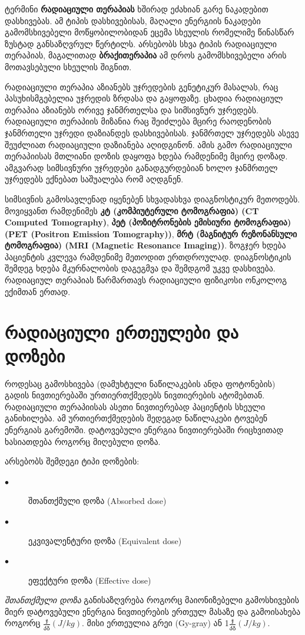 \documentclass[12pt,a4paper,]{report}
\begin{document}
ტერმინი \textbf{რადიაციული თერაპიას} ხშირად ეძახიან  გარე ნაკადებით დასხივებას. ამ ტიპის დასხივებისას, მაღალი ენერგიის ნაკადები გამომსხივებელი მოწყობილობიდან ეცემა სხეულის რომელიმე წინასწარ ზუსტად განსაზღვრულ წერტილს. არსებობს სხვა ტიპის რადიაციული თერაპიას, მაგალითად \textbf{ბრაქითერაპია}\cite{brachytherapy} ამ დროს გამომსხივებელი არის მოთავსებული სხეულის შიგნით. 

რადიაციული თერაპია აზიანებს უჯრედების გენეტიკურ მასალას, რაც პასუხისმგებელია უჯრედის ზრდასა და გაყოფაზე. ცხადია რადიაციულ თერაპია აზიანებს ორივე ჯანმრთელსა და სიმსივნურ უჯრედებს. რადიაციული თერაპიის მიზანია რაც შეიძლება მცირე რაოდენობის ჯანმრთელი უჯრედი დაზიანდეს დასხივებისას. ჯანმრთელ უჯრედებს ასევე შეუძლიათ რადიაციული დაზიანება აღიდგინონ. ამის გამო რადიაციული თერაპიისას მთლიანი დოზის დაყოფა ხდება რამდენიმე მცირე დოზად. ამგვარად სიმსივნური უჯრედები განადგურდებიან ხოლო ჯანმრთელ უჯრედებს ექნებათ საშუალება რომ აღდგნენ.

სიმსივნის გამოსავლენად იყენებენ სხვადასხვა დიაგნოსტიკურ მეთოდებს. მოვიყვანთ რამდენიმეს \textbf{კტ (კომპიუტერული ტომოგრაფია) (CT Computed Tomography)}, \textbf{პეტ (პოზიტრონების ემისიური ტომოგრაფია) (PET (Positron Emission Tomography))}, \textbf{მრტ (მაგნიტურ რეზონანსული ტომოგრაფია) (MRI (Magnetic Resonance Imaging))}. ზოგჯერ ხდება პაციენტის კვლევა რამდენიმე მეთოდით ერთდროულად. დიაგნოსტიკის შემდეგ ხდება მკურნალობის დაგეგმვა და შემდგომ უკვე დასხივება. რადიაციულ თერაპიას წარმართავს რადიაციული ფიზიკოსი ონკოლოგ ექიმთან ერთად. 

\chapter{რადიაციული ერთეულები და დოზები}
როდესაც გამოსხივება (დამუხტული ნაწილაკების ანდა ფოტონების) გადის ნივთიერებაში ურთიერთქმედებს ნივთიერების ატომებთან. რადიაციული თერაპიისას ასეთი ნივთიერებად პაციენტის სხეული განიხილება. ამ ურთიერთქმედების შედეგად ნაწილაკები ტოვებენ ენერგიას გარემოში. დატოვებული ენერგია ნივთიერებაში რიცხვითად ხასიათდება როგორც მიღებული დოზა. 

არსებობს შემდეგი ტიპი დოზების:
	\begin{description}
      \item[$\bullet$] შთანთქმული დოზა  (Absorbed dose)
      \item[$\bullet$] ეკვივალენტური დოზა (Equivalent dose)
      \item[$\bullet$] ეფექტური დოზა (Effective dose)
    \end{description}
    
\textit{შთანთქმული დოზა} განისაზღვრება როგორც მაიონიზებელი  გამოსხივების მიერ დატოვებული ენერგია ნივთიერების ერთეულ მასაზე და გამოისახება როგორც $\frac{\text{ჯ}}{\text{კგ}} (J/kg)$. მისი ერთეულია გრეი (Gy-gray) ან 1$\frac{\text{ჯ}}{\text{კგ}} (J/kg)$.
\end{document}
